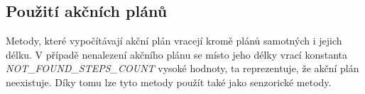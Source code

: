 \subsection{Použití akčních plánů}
Metody, které vypočítávají akční plán vracejí kromě plánů samotných i jejich délku. 
V případě nenalezení akčního plánu se místo jeho délky vrací konstanta \emph{\uppercase{not\_found\_steps\_count}} vysoké hodnoty, ta reprezentuje, že akční plán neexistuje.
Díky tomu lze tyto metody použít také jako senzorické metody. 


